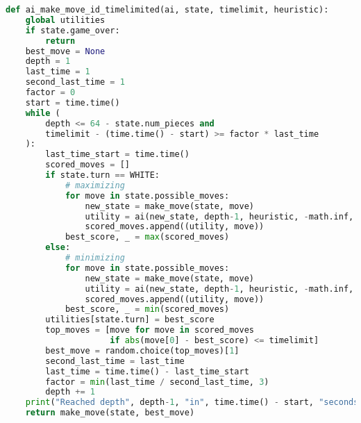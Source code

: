 \begin{lstlisting}[language=Python]
def ai_make_move_id_timelimited(ai, state, timelimit, heuristic):
    global utilities
    if state.game_over:
        return
    best_move = None
    depth = 1
    last_time = 1
    second_last_time = 1
    factor = 0
    start = time.time()
    while (
        depth <= 64 - state.num_pieces and
        timelimit - (time.time() - start) >= factor * last_time
    ):
        last_time_start = time.time()
        scored_moves = []
        if state.turn == WHITE:
            # maximizing
            for move in state.possible_moves:
                new_state = make_move(state, move)
                utility = ai(new_state, depth-1, heuristic, -math.inf, math.inf)
                scored_moves.append((utility, move))
            best_score, _ = max(scored_moves)
        else:
            # minimizing
            for move in state.possible_moves:
                new_state = make_move(state, move)
                utility = ai(new_state, depth-1, heuristic, -math.inf, math.inf)
                scored_moves.append((utility, move))
            best_score, _ = min(scored_moves)
        utilities[state.turn] = best_score
        top_moves = [move for move in scored_moves
                     if abs(move[0] - best_score) <= timelimit]
        best_move = random.choice(top_moves)[1]
        second_last_time = last_time
        last_time = time.time() - last_time_start
        factor = min(last_time / second_last_time, 3)
        depth += 1
    print("Reached depth", depth-1, "in", time.time() - start, "seconds")
    return make_move(state, best_move)
\end{lstlisting}
